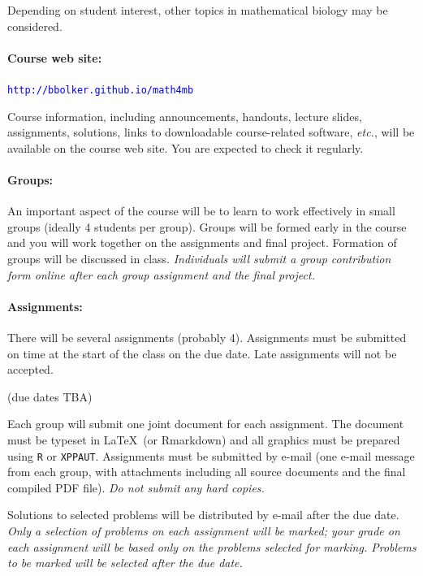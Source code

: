 \documentclass[12pt]{article}
\newcommand{\url}[1]{{\tt\textcolor{blue}{#1}}}
\newcommand{\note}{\noindent{\bfseries\slshape Note:\/} }
\begin{document}
Depending on student interest, other topics in mathematical biology may be considered.

\paragraph*{Course web site:} \url{http://bbolker.github.io/math4mb}

\noindent
Course information, including announcements, handouts, lecture slides, assignments, solutions, links to downloadable course-related software, {\it etc.\/}, will be available on the course web site.  You are expected to check it regularly.

\paragraph*{Groups:} An important aspect of the course will be to learn to work effectively in small groups (ideally 4 students per group).  Groups will be formed early in the course and you will work together on the assignments and final project.  Formation of groups will be discussed in class.  \emph{Individuals will submit a group contribution form online after each group assignment and the final project.}

\paragraph*{Assignments:} There will be several assignments (probably 4).  Assignments must be submitted on time at the start of the class on the due date.  Late assignments will not be accepted.

(due dates TBA)

\noindent
Each group will submit one joint document for each assignment.  The
document must be typeset in \LaTeX\ (or Rmarkdown) and all graphics must be prepared
using {\tt R} or {\tt XPPAUT}.  Assignments must be submitted by
e-mail (one e-mail message from each group, with attachments including
all source documents and the final compiled PDF file).  \emph{Do not
 submit any hard copies.}

Solutions to selected problems will be distributed by e-mail after the due date.
\note \emph{Only a selection of problems on each assignment will be marked; your grade on each assignment will be based only on the problems selected for marking.  Problems to be marked will be selected after the due date.}
\end{document}
